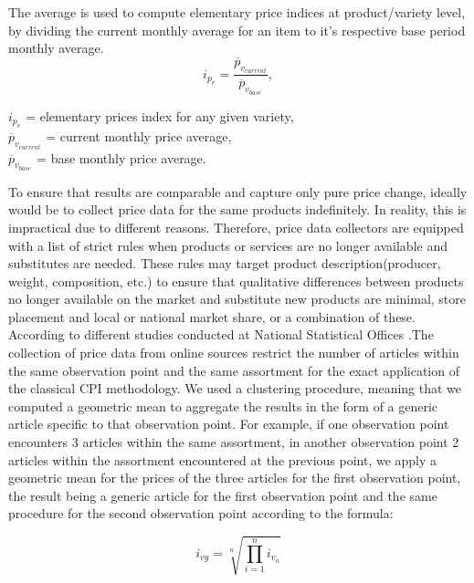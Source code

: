 \documentclass[]{article}
\begin{document}
The average is used to compute elementary 
price indices at product/variety level, by dividing the current monthly average for an item to it's respective base period monthly average. 
\begin{equation}\label{eq:2}
i_{p_{v}} = \frac{\overline{p}_{v_{current}}}{\overline{p}_{v_{base}}} ,
\end{equation}
\begin{center}	
	$i_{p_{v}}$ = elementary prices index for any given variety, \\
	$\overline{p}_{v_{current}}$ = current monthly price average, \\
	$\overline{p}_{v_{base}}$ = base monthly price average.
\end{center} 

To ensure that results are comparable and capture only pure price change, ideally would be to collect price data for the same products indefinitely\cite{cpi2}. In reality, this is impractical due to different reasons. Therefore, price data collectors are equipped with a list of strict rules when products or services are no longer available and substitutes are needed. These rules may target product description(producer, weight, composition, etc.) to ensure that qualitative differences between products no longer available on the market and substitute new products are minimal, store placement and local or national market share, or a combination of these\cite{cpi}.
According to different studies conducted at National Statistical Offices \cite{}.The collection of price data from online sources  
restrict the number of articles within the same observation point and the same assortment for the exact application 
of the classical CPI methodology. We used a clustering procedure, meaning that we computed a geometric mean to 
aggregate the results in the form of a generic article specific to that observation point. For example, if one 
observation point encounters 3 articles within the same assortment, in another observation point 2 articles 
within the assortment encountered at the previous point, we apply a geometric mean for the prices of the three 
articles for the first observation point, the result being a generic article for the first observation point and the 
same procedure for the second observation point according to the formula:

\begin{equation}\label{eq:3}
i_{vg} = \sqrt[n]{\prod_{i=1}^{n} i_{v_{n}}}
\end{equation}
\end{document}
